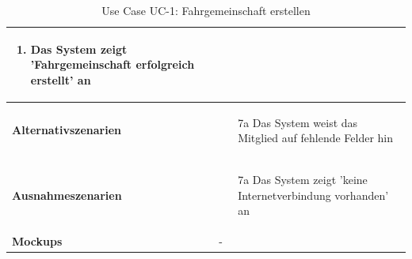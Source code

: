 \begin{table}[ht]
\begin{tabular}{ l | p{10cm} }
\begin{enumerate}
					\item Das System zeigt 'Fahrgemeinschaft erfolgreich erstellt' an
					\end{enumerate}
					\\ \hline
	\textbf{Alternativszenarien}	&	\begin{enumerate}
					\item[7a] Das System weist das Mitglied auf fehlende Felder hin
					\end{enumerate}
					\\ \hline
	\textbf{Ausnahmeszenarien}&	\begin{enumerate}
					\item[7a] Das System zeigt 'keine Internetverbindung vorhanden' an
					\end{enumerate}
					\\ \hline
	\textbf{Mockups}	 	&	-
  \end{tabular}
   \caption{Use Case UC-1: Fahrgemeinschaft erstellen}\label{table:use_case_1}
\end{table}

